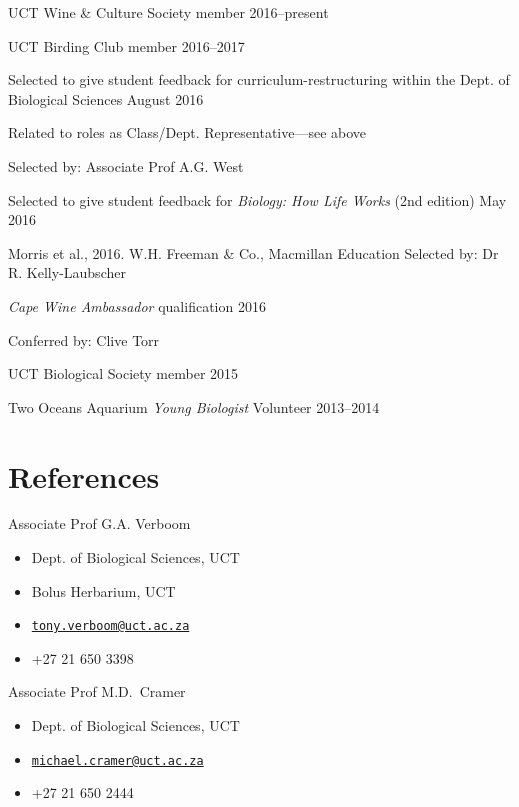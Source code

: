 \documentclass[]{article}
\providecommand{\tightlist}{%
  \setlength{\itemsep}{0pt}\setlength{\parskip}{0pt}}
\begin{document}
UCT Wine \& Culture Society member \hfill 2016--present

UCT Birding Club member \hfill 2016--2017

Selected to give student feedback for curriculum-restructuring within
the Dept. of Biological Sciences \hfill August 2016

\par

Related to roles as Class/Dept. Representative---see above

\par

Selected by: Associate Prof A.G. West

Selected to give student feedback for \emph{Biology: How Life Works}
(2nd edition) \hfill May 2016

\par

Morris et al., 2016. W.H. Freeman \& Co., Macmillan Education
\pra Selected by: Dr R. Kelly-Laubscher

\emph{Cape Wine Ambassador} qualification \hfill 2016

\par

Conferred by: Clive Torr

UCT Biological Society member \hfill 2015

Two Oceans Aquarium \emph{Young Biologist} Volunteer \hfill 2013--2014

\hypertarget{references}{%
\section{References}\label{references}}

Associate Prof G.A. Verboom

\begin{itemize}
\tightlist
\item
  Dept. of Biological Sciences, UCT
\item
  Bolus Herbarium, UCT
\item
  \href{mailto:tony.verboom@uct.ac.za}{\nolinkurl{tony.verboom@uct.ac.za}}
\item
  +27 21 650 3398
\end{itemize}

Associate Prof M.D.~Cramer

\begin{itemize}
\tightlist
\item
  Dept. of Biological Sciences, UCT
\item
  \href{mailto:michael.cramer@uct.ac.za}{\nolinkurl{michael.cramer@uct.ac.za}}
\item
  +27 21 650 2444
\end{itemize}
\end{document}

